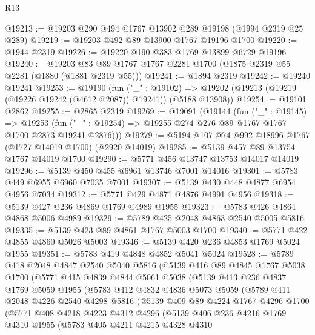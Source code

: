 \begin{lexlean}{R13}
\begin{coremodule}
@19213 := @19203 @290 @494 @1767 @13902 @289 @19198 (@1994 @2319 @25 @289)
@19219 := @19203 @492 @89 @13900 @1767 @19196 @1700
@19220 := @1944 @2319
@19226 := @19220 @190 @383 @1769 @13899 @6729 @19196
@19240 := @19203 @83 @89 @1767 @1767 @2281 @1700 (@1875 @2319 @55 @2281 (@1880 (@1881 @2319 @55)))
@19241 := @1894 @2319
@19242 := @19240 @19241
@19253 := @19190
    (fun ("_" : @19102) =>
    @19202 (@19213 (@19219 (@19226 @19242 (@4612 @2087)) @19241)) (@5188 @13908))
@19254 := @19101 @2862
@19255 := @2865 @2319
@19269 := @19091
    (@19144
      (fun ("_" : @19145) =>
      @19253 (fun ("_" : @19254) => @19255 @274 @276 @89 @1767 @1767 @1700 @2873 @19241 @2876)))
@19279 := @5194 @107 @74 @992 @18996 @1767 (@1727 @14019 @1700) (@2920 @14019)
@19285 := @5139 @457 @89 @13754 @1767 @14019 @1700
@19290 := @5771 @456 @13747 @13753 @14017 @14019
@19296 := @5139 @450 @455 @6961 @13746 @7001 @14016
@19301 := @5783 @449 @6955 @6960 @7035 @7001
@19307 := @5139 @430 @448 @4877 @6954 @4956 @7034
@19312 := @5771 @429 @4871 @4876 @4991 @4956
@19318 := @5139 @427 @236 @4869 @1769 @4989 @1955
@19323 := @5783 @426 @4864 @4868 @5006 @4989
@19329 := @5789 @425 @2048 @4863 @2540 @5005 @5816
@19335 := @5139 @423 @89 @4861 @1767 @5003 @1700
@19340 := @5771 @422 @4855 @4860 @5026 @5003
@19346 := @5139 @420 @236 @4853 @1769 @5024 @1955
@19351 := @5783 @419 @4848 @4852 @5041 @5024
@19528 := @5789
    @418
    @2048
    @4847
    @2540
    @5040
    @5816
    (@5139
      @416
      @89
      @4845
      @1767
      @5038
      @1700
      (@5771
        @415
        @4839
        @4844
        @5061
        @5038
        (@5139
          @413
          @236
          @4837
          @1769
          @5059
          @1955
          (@5783
            @412
            @4832
            @4836
            @5073
            @5059
            (@5789
              @411
              @2048
              @4226
              @2540
              @4298
              @5816
              (@5139
                @409
                @89
                @4224
                @1767
                @4296
                @1700
                (@5771
                  @408
                  @4218
                  @4223
                  @4312
                  @4296
                  (@5139
                    @406
                    @236
                    @4216
                    @1769
                    @4310
                    @1955
                    (@5783
                      @405
                      @4211
                      @4215
                      @4328
                      @4310

\end{coremodule}
\end{lexlean}
